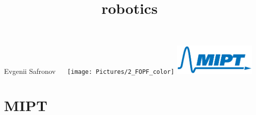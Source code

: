 \documentclass{beamer}
\title[Blah blah]{robotics }
\author{}
\institute{MIPT, 325}
\date{}
\begin{document}

\begin{frame}
\centering
\textcolor{beamer@fopfblue}{\Huge \quad \quad \quad Evgenii} \textcolor{beamer@miptblue}{\Huge Safronov \quad \quad~~}  
\newline
\newline{}
\texttt{[image: Pictures/2\_FOPF\_color]} \quad
\includegraphics[width=0.3\textwidth]{Pictures/eng}
\end{frame}
\section{MIPT}
\end{document}
